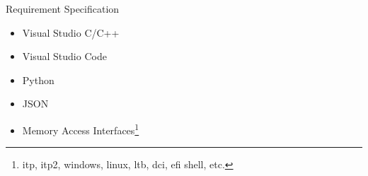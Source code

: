 \begin{frame}{Requirement Specification}
	\begin{itemize}
		\item Visual Studio C/C++
		\item Visual Studio Code
		\item Python
		\item JSON
        \item Memory Access Interfaces\footnote{itp, itp2, windows, linux, ltb, dci, efi shell, etc.}
	\end{itemize}
\end{frame}